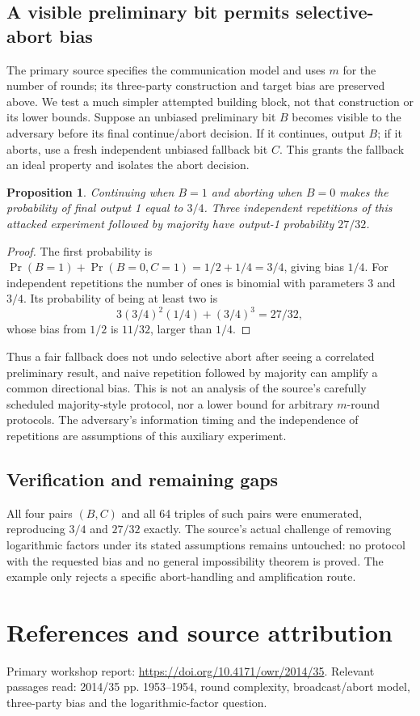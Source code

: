 \documentclass[11pt]{article}
\newtheorem{proposition}{Proposition}
\begin{document}
\subsection{A visible preliminary bit permits selective-abort bias}
The primary source specifies the communication model and uses $m$ for the number of rounds; its three-party construction and target bias are preserved above. We test a much simpler attempted building block, not that construction or its lower bounds. Suppose an unbiased preliminary bit $B$ becomes visible to the adversary before its final continue/abort decision. If it continues, output $B$; if it aborts, use a fresh independent unbiased fallback bit $C$. This grants the fallback an ideal property and isolates the abort decision.
\begin{proposition}
Continuing when $B=1$ and aborting when $B=0$ makes the probability of final output 1 equal to $3/4$. Three independent repetitions of this attacked experiment followed by majority have output-1 probability $27/32$.
\end{proposition}
\begin{proof}
The first probability is $\Pr(B=1)+\Pr(B=0,C=1)=1/2+1/4=3/4$, giving bias $1/4$. For independent repetitions the number of ones is binomial with parameters 3 and $3/4$. Its probability of being at least two is
\[
3(3/4)^2(1/4)+(3/4)^3=27/32,
\]
whose bias from $1/2$ is $11/32$, larger than $1/4$.
\end{proof}
Thus a fair fallback does not undo selective abort after seeing a correlated preliminary result, and naive repetition followed by majority can amplify a common directional bias. This is not an analysis of the source's carefully scheduled majority-style protocol, nor a lower bound for arbitrary $m$-round protocols. The adversary's information timing and the independence of repetitions are assumptions of this auxiliary experiment.
\subsection{Verification and remaining gaps}
All four pairs $(B,C)$ and all 64 triples of such pairs were enumerated, reproducing $3/4$ and $27/32$ exactly. The source's actual challenge of removing logarithmic factors under its stated assumptions remains untouched: no protocol with the requested bias and no general impossibility theorem is proved. The example only rejects a specific abort-handling and amplification route.

\section{References and source attribution}
Primary workshop report: \url{https://doi.org/10.4171/owr/2014/35}. Relevant passages read: 2014/35 pp. 1953--1954, round complexity, broadcast/abort model, three-party bias and the logarithmic-factor question.
\end{document}
